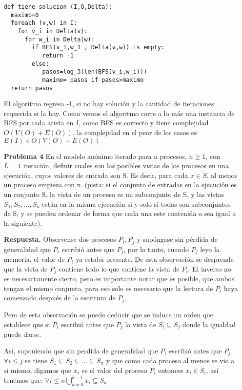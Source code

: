 \documentclass{article}
\begin{document}
\begin{enumerate}
\begin{lstlisting}[frame=single]
def tiene_solucion (I,O,Delta):
  maximo=0
  foreach (v,w) in I:
    for v_i in Delta(v):
      for w_i in Delta(w):
        if BFS(v_1,w_1 , Delta(v,w)) is empty:
           return -1
        else:
           pasos=log_3(len(BFS(v_i,w_i)))
           maximo= pasos if pasos>maximo
  return pasos
\end{lstlisting}

El algoritmo regresa -1, si no hay solución y la cantidad de iteraciones requerida si la hay.
Como vemos el algoritmo corre a lo más una instancia de BFS por cada arista en $I$, como BFS es correcto y tiene complejidad $O(V(O)+E(O))$,
la complejidad en el peor de los casos es $E(I) \times O(V(O)+E(O))$


\item[\bf{Problema 4}] En el modelo anónimo iterado para n procesos, $n \ge 1$, con $L = 1$ iteración, definir cuales son las posibles vistas de los procesos en una ejecución,
cuyos valores de entrada son S. Es decir, para cada $x \in S$, al menos un proceso empieza con x. (pista: si el conjunto de entradas en la ejecución es un conjunto S, la vista de un proceso es un subconjunto de S, y las vistas $S_1,S_2,...,S_k$ están en la misma ejecución si y solo si todas son subconjuntos de S, y se pueden ordenar de forma que cada una este contenida o sea igual a la siguiente).


\item[\bf{Respuesta.}] Observense dos procesos $P_i, P_j$ y supóngase sin pérdida de generalidad que $P_i$ escribió antes que $P_j$, por lo tanto, cuando $P_j$ leyo la memoria, el valor de $P_i$ ya estaba presente. De esta observación se desprende que la vista de $P_j$ contiene todo lo que contiene la vista de $P_i$. El inverso no es necesariamente cierto, pero es importante notar que es posible, que ambos tengan el mismo conjunto, para eso solo es necesario que la lectura de $P_i$ haya comenzado después de la escritura de $P_j$.

Pero de esta observación se puede deducir que se induce un orden que establece que si $P_i$ escribió antes que $P_j$ la vista de $S_i \subseteq S_j$ donde la igualdad puede darse.

Así, suponiendo que sin perdida de generalidad que $P_i$ escribió antes que $P_j$ $\forall i \le j$ se tiene $S_1 \subseteq S_2 \subseteq ... \subseteq S_n$ y que como cada proceso al menos se vio a si mismo, digamos que $x_i$ es el valor del proceso $P_i$ entonces $x_i \in S_i $, así tenemos que:
$\forall i\le n  \bigcup_{k=0}^{k=i} x_i  \subseteq   S_k$


\end{enumerate}
\end{document}
